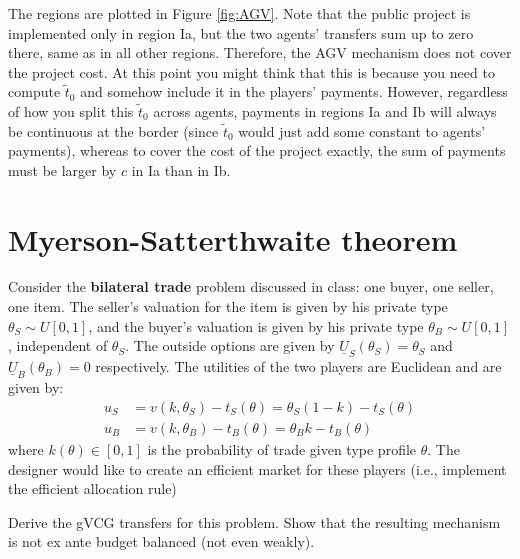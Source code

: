 \documentclass[a4paper]{article}
\begin{document}
The regions are plotted in Figure \ref{fig:AGV}. Note that the public project is implemented only in region Ia, but the two agents' transfers sum up to zero there, same as in all other regions. Therefore, the AGV mechanism does not cover the project cost.
At this point you might think that this is because you need to compute $\tilde{t}_0$ and somehow include it in the players' payments. However, regardless of how you split this $\tilde{t}_0$ across agents, payments in regions Ia and Ib will always be continuous at the border (since $\tilde{t}_0$ would just add some constant to agents' payments), whereas to cover the cost of the project exactly, the sum of payments must be larger by $c$ in Ia than in Ib.
\fi 



\section{Myerson-Satterthwaite theorem}

Consider the \textbf{bilateral trade} problem discussed in class: one buyer, one seller, one item. The seller's valuation for the item is given by his private type $\theta_S \sim U[0,1]$, and the buyer's valuation is given by his private type $\theta_B \sim U[0,1]$, independent of $\theta_S$. The outside options are given by $\underline{U}_S({\theta}_S)={\theta}_S$ and $\underline{U}_B({\theta}_B)=0$ respectively. The utilities of the two players are Euclidean and are given by:
\begin{align*}
	u_S &= v(k,\theta_S)-t_S(\theta)=\theta_S (1-k)-t_S(\theta)
	\\
	u_B &= v(k,\theta_B)-t_B(\theta)=\theta_B k-t_B(\theta)
\end{align*}
where $k(\theta) \in [0,1]$ is the probability of trade given type profile $\theta$. The designer would like to create an efficient market for these players (i.e., implement the efficient allocation rule)

Derive the gVCG transfers for this problem. Show that the resulting mechanism is not ex ante budget balanced (not even weakly).
\end{document}
